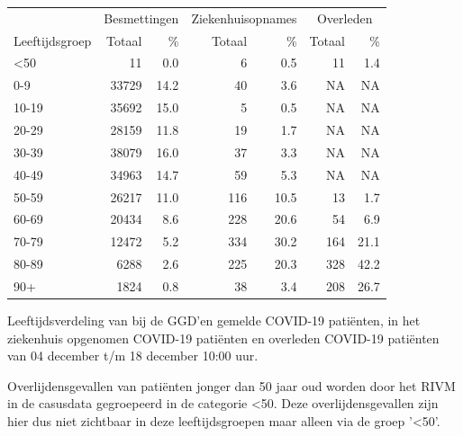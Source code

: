 \documentclass[
  english,
  man,floatsintext]{apa6}
\begin{document}
\begin{table}
\centering\begingroup\fontsize{11}{13}\selectfont

\begin{threeparttable}
\begin{tabular}{lrrrrrr}
\toprule
\multicolumn{1}{c}{ } & \multicolumn{2}{c}{Besmettingen} & \multicolumn{2}{c}{Ziekenhuisopnames} & \multicolumn{2}{c}{Overleden} \\
\cmidrule(l{3pt}r{3pt}){2-3} \cmidrule(l{3pt}r{3pt}){4-5} \cmidrule(l{3pt}r{3pt}){6-7}
Leeftijdsgroep & Totaal & \% & Totaal & \% & Totaal & \%\\
\midrule
<50 & 11 & 0.0 & 6 & 0.5 & 11 & 1.4\\
0-9 & 33729 & 14.2 & 40 & 3.6 & NA & NA\\
10-19 & 35692 & 15.0 & 5 & 0.5 & NA & NA\\
20-29 & 28159 & 11.8 & 19 & 1.7 & NA & NA\\
30-39 & 38079 & 16.0 & 37 & 3.3 & NA & NA\\
40-49 & 34963 & 14.7 & 59 & 5.3 & NA & NA\\
50-59 & 26217 & 11.0 & 116 & 10.5 & 13 & 1.7\\
60-69 & 20434 & 8.6 & 228 & 20.6 & 54 & 6.9\\
70-79 & 12472 & 5.2 & 334 & 30.2 & 164 & 21.1\\
80-89 & 6288 & 2.6 & 225 & 20.3 & 328 & 42.2\\
90+ & 1824 & 0.8 & 38 & 3.4 & 208 & 26.7\\
\bottomrule
\end{tabular}
\begin{tablenotes}
\item[1] Leeftijdsverdeling van bij de GGD’en gemelde COVID-19 patiënten, in het ziekenhuis opgenomen COVID-19 patiënten en overleden COVID-19 patiënten van 04 december t/m 18 december 10:00 uur.
\item[2] Overlijdensgevallen van patiënten jonger dan 50 jaar oud worden door het RIVM in de casusdata gegroepeerd in de categorie <50. Deze overlijdensgevallen zijn hier dus niet zichtbaar in deze leeftijdsgroepen maar alleen via de groep '<50'.
\end{tablenotes}
\end{threeparttable}
\endgroup{}
\end{table}

\newpage
\end{document}
